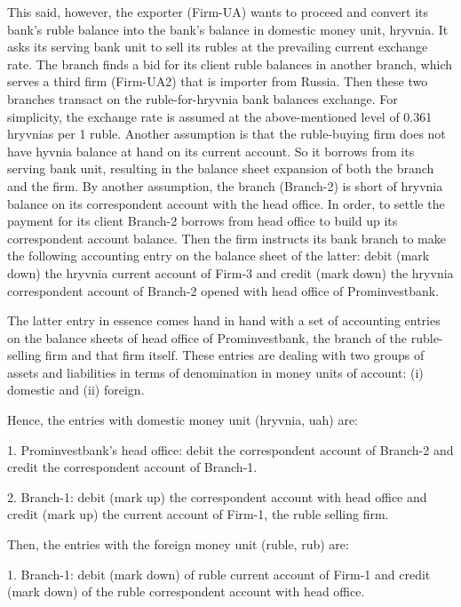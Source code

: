 This said, however, the exporter (Firm-UA) wants to proceed and convert its bank's ruble balance into the bank's balance in domestic money unit, hryvnia. It asks its serving bank unit to sell its rubles at the prevailing current exchange rate. The branch finds a bid for its client ruble balances in another branch, which serves a third firm (Firm-UA2) that is importer from Russia. Then these two branches transact on the ruble-for-hryvnia bank balances exchange. For simplicity, the exchange rate is assumed at the above-mentioned level of 0.361 hryvnias per 1 ruble. Another assumption is that the ruble-buying firm does not have hyvnia balance at hand on its current account. So it borrows from its serving bank unit, resulting in the balance sheet expansion of both the branch and the firm. By another assumption, the branch (Branch-2) is short of hryvnia balance on its correspondent account with the head office. In order, to settle the payment for its client Branch-2 borrows from head office to build up its correspondent account balance. Then the firm instructs its bank branch to make the following accounting entry on the balance sheet of the latter: debit (mark down) the hryvnia current account of Firm-3 and credit (mark down) the hryvnia correspondent account of Branch-2 opened with head office of Prominvestbank. \par

The latter entry in essence comes hand in hand with a set of accounting entries on the balance sheets of head office of Prominvestbank, the branch of the ruble-selling firm and that firm itself. These entries are dealing with two groups of assets and liabilities in terms of denomination in money units of account: (i) domestic and (ii) foreign.  \par 

Hence, the entries with domestic money unit (hryvnia, \ac{uah}) are: \par 

1. Prominvestbank's head office: debit the correspondent account of Branch-2 and credit the correspondent account of Branch-1. 

2. Branch-1: debit (mark up) the correspondent account with head office and credit (mark up) the current account of Firm-1, the ruble selling firm. 

Then, the entries with the foreign money unit (ruble, \ac{rub}) are: \par

1. Branch-1: debit (mark down) of ruble current account of Firm-1 and credit (mark down) of the ruble correspondent account with head office.

